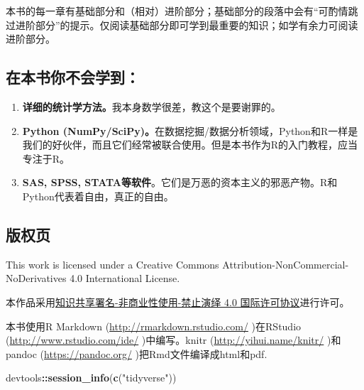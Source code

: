 \documentclass[]{book}
\newenvironment{Shaded}{\begin{snugshade}}{\end{snugshade}}
\newcommand{\KeywordTok}[1]{\textcolor[rgb]{0.13,0.29,0.53}{\textbf{#1}}}
\newcommand{\NormalTok}[1]{#1}
\newcommand{\OperatorTok}[1]{\textcolor[rgb]{0.81,0.36,0.00}{\textbf{#1}}}
\newcommand{\StringTok}[1]{\textcolor[rgb]{0.31,0.60,0.02}{#1}}
\providecommand{\tightlist}{%
  \setlength{\itemsep}{0pt}\setlength{\parskip}{0pt}}
\begin{document}
本书的每一章有基础部分和（相对）进阶部分；基础部分的段落中会有``可酌情跳过进阶部分''的提示。仅阅读基础部分即可学到最重要的知识；如学有余力可阅读进阶部分。

\subsection*{在本书你不会学到：}

\begin{enumerate}
\def\labelenumi{\arabic{enumi}.}
\tightlist
\item
  \textbf{详细的统计学方法。}我本身数学很差，教这个是要谢罪的。
\item
  \textbf{Python (NumPy/SciPy)。}在数据挖掘/数据分析领域，Python和R一样是我们的好伙伴，而且它们经常被联合使用。但是本书作为R的入门教程，应当专注于R。
\item
  \textbf{SAS, SPSS, STATA等软件}。它们是万恶的资本主义的邪恶产物。R和Python代表着自由，真正的自由。
\end{enumerate}

\subsection*{版权页}

This work is licensed under a Creative Commons Attribution-NonCommercial-NoDerivatives 4.0 International License.
\doclicenseThis

本作品采用\href{https://creativecommons.org/licenses/by-nc-nd/4.0/deed.zh}{知识共享署名-非商业性使用-禁止演绎 4.0 国际许可协议}进行许可。

本书使用R Markdown (\url{http://rmarkdown.rstudio.com/} )在RStudio (\url{http://www.rstudio.com/ide/} )中编写。knitr (\url{http://yihui.name/knitr/} )和pandoc (\url{https://pandoc.org/} )把Rmd文件编译成html和pdf.

\begin{Shaded}
\begin{Highlighting}[]
\NormalTok{devtools}\OperatorTok{::}\KeywordTok{session_info}\NormalTok{(}\KeywordTok{c}\NormalTok{(}\StringTok{"tidyverse"}\NormalTok{))}
\end{Highlighting}
\end{Shaded}
\end{document}
